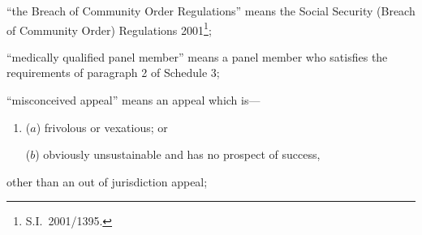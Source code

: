 \documentclass[12pt,a4paper]{article}
\begin{document}
\begin{enumerate}
“the Breach of Community Order Regulations” means the Social Security (Breach of Community Order) Regulations 2001\footnote{S.I.\ 2001/1395.};


“medically qualified panel member” means a panel member who satisfies the requirements of paragraph 2 of Schedule 3;

“misconceived appeal” means an appeal which is—
\begin{enumerate}\item[]
($a$) frivolous or vexatious; or

($b$) obviously unsustainable and has no prospect of success,
\end{enumerate}
other than an out of jurisdiction appeal;


%
%


\end{enumerate}
\end{document}

